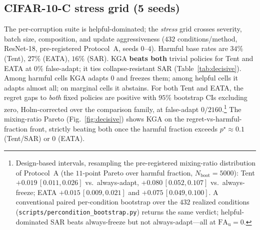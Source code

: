 \documentclass[conference]{IEEEtran}
\theoremstyle{plain}
\theoremstyle{definition}
\theoremstyle{remark}
\begin{document}
\subsection{CIFAR-10-C stress grid (5 seeds)}
The per-corruption suite is helpful-dominated; the \emph{stress} grid crosses severity,
batch size, composition, and update aggressiveness ($432$ conditions/method, ResNet-18,
pre-registered Protocol~A, seeds $0$--$4$). Harmful base rates are $34\%$ (Tent),
$27\%$ (EATA), $16\%$ (SAR). \textsc{KGA} \textbf{beats both} trivial policies for
Tent and EATA at $0\%$ false-adapt; it ties collapse-resistant SAR
(Table~\ref{tab:decisive}). Among harmful cells \textsc{KGA} adapts $0$ and freezes them;
among helpful cells it adapts almost all; on marginal cells it abstains. For both Tent and EATA,
the regret gaps to \emph{both} fixed policies are positive with $95\%$ bootstrap CIs excluding
zero, Holm-corrected over the comparison family, at false-adapt
$0/2160$.\footnote{Design-based intervals, resampling the pre-registered mixing-ratio
distribution of Protocol~A (the $11$-point Pareto over harmful fraction,
$N_{\mathrm{boot}}{=}5000$): Tent $+0.019\,[0.011,0.026]$ vs.\ always-adapt,
$+0.080\,[0.052,0.107]$ vs.\ always-freeze; EATA $+0.015\,[0.009,0.021]$ and
$+0.075\,[0.049,0.100]$. A conventional paired per-condition bootstrap over the $432$ realized
conditions (\texttt{scripts/percondition\_bootstrap.py}) returns the same verdict;
helpful-dominated SAR beats always-freeze but not always-adapt---all at
$\mathrm{FA}_{\mathrm u}{=}0$.} The mixing-ratio Pareto (Fig.~\ref{fig:decisive}) shows \textsc{KGA} on the
regret-vs-harmful-fraction front, strictly beating both once the harmful fraction exceeds
$p^\star{\approx}0.1$ (Tent/SAR) or $0$ (EATA).
\end{document}
